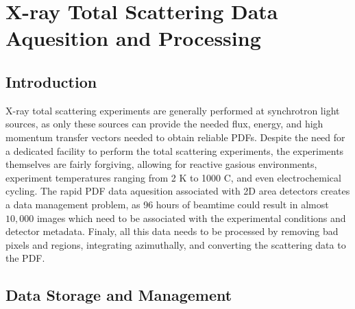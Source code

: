 \graphicspath{{dp/figures/}}
\chapter{X-ray Total Scattering Data Aquesition and Processing} \label{ch:dp}
\section{Introduction}
X-ray total scattering experiments are generally performed at synchrotron light sources, as only these sources can provide the needed flux, energy, and high momentum transfer vectors needed to obtain reliable PDFs.
Despite the need for a dedicated facility to perform the total scattering experiments, the experiments themselves are fairly forgiving, allowing for reactive gasious environments, experiment temperatures ranging from 2 \si{K} to 1000 \si{C}, and even electrochemical cycling.
The rapid PDF data aquesition associated with 2D area detectors creates a data management problem, as 96 hours of beamtime could result in almost $10,000$ images which need to be associated with the experimental conditions and detector metadata.
 Finaly, all this data needs to be processed by removing bad pixels and regions, integrating azimuthally, and converting the scattering data to the PDF.

\section{Data Storage and Management}

